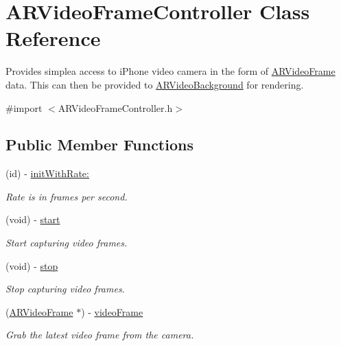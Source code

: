 \hypertarget{interface_a_r_video_frame_controller}{\section{A\-R\-Video\-Frame\-Controller Class Reference}
\label{interface_a_r_video_frame_controller}
}


Provides simplea access to i\-Phone video camera in the form of \hyperlink{struct_a_r_video_frame}{A\-R\-Video\-Frame} data. This can then be provided to \hyperlink{interface_a_r_video_background}{A\-R\-Video\-Background} for rendering.  




{\ttfamily \#import $<$A\-R\-Video\-Frame\-Controller.\-h$>$}

\subsection*{Public Member Functions}
\begin{DoxyCompactItemize}
\item 
\hypertarget{interface_a_r_video_frame_controller_a94f7769c58f9202da3eeab9b452df4ad}{(id) -\/ \hyperlink{interface_a_r_video_frame_controller_a94f7769c58f9202da3eeab9b452df4ad}{init\-With\-Rate\-:}}\label{interface_a_r_video_frame_controller_a94f7769c58f9202da3eeab9b452df4ad}

\begin{DoxyCompactList}\small\item\em Rate is in frames per second. \end{DoxyCompactList}\item 
\hypertarget{interface_a_r_video_frame_controller_a6ee104be0e287fea2f8beed4f4e97cf6}{(void) -\/ \hyperlink{interface_a_r_video_frame_controller_a6ee104be0e287fea2f8beed4f4e97cf6}{start}}\label{interface_a_r_video_frame_controller_a6ee104be0e287fea2f8beed4f4e97cf6}

\begin{DoxyCompactList}\small\item\em Start capturing video frames. \end{DoxyCompactList}\item 
\hypertarget{interface_a_r_video_frame_controller_a509702d9d3e1fa9932bb304ea3f509fb}{(void) -\/ \hyperlink{interface_a_r_video_frame_controller_a509702d9d3e1fa9932bb304ea3f509fb}{stop}}\label{interface_a_r_video_frame_controller_a509702d9d3e1fa9932bb304ea3f509fb}

\begin{DoxyCompactList}\small\item\em Stop capturing video frames. \end{DoxyCompactList}\item 
(\hyperlink{struct_a_r_video_frame}{A\-R\-Video\-Frame} $\ast$) -\/ \hyperlink{interface_a_r_video_frame_controller_acc064912b45b3e81fcbc8b21d2953e29}{video\-Frame}
\begin{DoxyCompactList}\small\item\em Grab the latest video frame from the camera. \end{DoxyCompactList}\end{DoxyCompactItemize}


